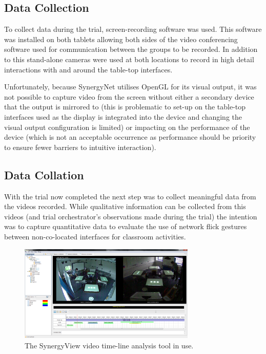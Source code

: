 \documentclass[a4paper,11pt]{article}
\begin{document}
\subsection{Data Collection}

To collect data during the trial, screen-recording software was used.
This software was installed on both tablets allowing both sides of the video conferencing software used for communication between the groups to be recorded.
In addition to this stand-alone cameras were used at both locations to record in high detail interactions with and around the table-top interfaces.

Unfortunately, because SynergyNet utilises OpenGL for its visual output, it was not possible to capture video from the screen without either a secondary device that the output is mirrored to (this is problematic to set-up on the table-top interfaces used as the display is integrated into the device and changing the visual output configuration is limited) or impacting on the performance of the device (which is not an acceptable occurrence as performance should be priority to ensure fewer barriers to intuitive interaction).

\subsection{Data Collation}

With the trial now completed the next step was to collect meaningful data from the videos recorded.
While qualitative information can be collected from this videos (and trial orchestrator's observations made during the trial) the intention was to capture quantitative data to evaluate the use of network flick gestures between non-co-located interfaces for classroom activities.

\begin{figure}[h]
 \centering
   \includegraphics[width=0.75\textwidth]{figures/synergyviewexample.png}
   \caption{The SynergyView video time-line analysis tool in use.}
   \label{fig:SynergyviewExample}
\end{figure}
\end{document}
